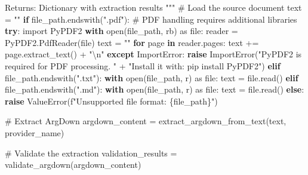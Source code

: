 \documentclass[
  11pt,
  letterpaper,
]{book}
\newenvironment{Shaded}{\begin{snugshade}}{\end{snugshade}}
\newcommand{\BuiltInTok}[1]{\textcolor[rgb]{0.00,0.23,0.31}{#1}}
\newcommand{\CharTok}[1]{\textcolor[rgb]{0.13,0.47,0.30}{#1}}
\newcommand{\CommentTok}[1]{\textcolor[rgb]{0.37,0.37,0.37}{#1}}
\newcommand{\ControlFlowTok}[1]{\textcolor[rgb]{0.00,0.23,0.31}{\textbf{#1}}}
\newcommand{\ImportTok}[1]{\textcolor[rgb]{0.00,0.46,0.62}{#1}}
\newcommand{\KeywordTok}[1]{\textcolor[rgb]{0.00,0.23,0.31}{\textbf{#1}}}
\newcommand{\NormalTok}[1]{\textcolor[rgb]{0.00,0.23,0.31}{#1}}
\newcommand{\OperatorTok}[1]{\textcolor[rgb]{0.37,0.37,0.37}{#1}}
\newcommand{\PreprocessorTok}[1]{\textcolor[rgb]{0.68,0.00,0.00}{#1}}
\newcommand{\SpecialCharTok}[1]{\textcolor[rgb]{0.37,0.37,0.37}{#1}}
\newcommand{\SpecialStringTok}[1]{\textcolor[rgb]{0.13,0.47,0.30}{#1}}
\newcommand{\StringTok}[1]{\textcolor[rgb]{0.13,0.47,0.30}{#1}}
\begin{document}
\begin{Shaded}
\begin{Highlighting}[]
\CommentTok{    Returns:}
\CommentTok{        Dictionary with extraction results}
\CommentTok{    """}
    \CommentTok{\# Load the source document}
\NormalTok{    text }\OperatorTok{=} \StringTok{""}
    \ControlFlowTok{if}\NormalTok{ file\_path.endswith(}\StringTok{".pdf"}\NormalTok{):}
        \CommentTok{\# PDF handling requires additional libraries}
        \ControlFlowTok{try}\NormalTok{:}
            \ImportTok{import}\NormalTok{ PyPDF2}
            \ControlFlowTok{with} \BuiltInTok{open}\NormalTok{(file\_path, }\StringTok{\textquotesingle{}rb\textquotesingle{}}\NormalTok{) }\ImportTok{as} \BuiltInTok{file}\NormalTok{:}
\NormalTok{                reader }\OperatorTok{=}\NormalTok{ PyPDF2.PdfReader(}\BuiltInTok{file}\NormalTok{)}
\NormalTok{                text }\OperatorTok{=} \StringTok{""}
                \ControlFlowTok{for}\NormalTok{ page }\KeywordTok{in}\NormalTok{ reader.pages:}
\NormalTok{                    text }\OperatorTok{+=}\NormalTok{ page.extract\_text() }\OperatorTok{+} \StringTok{"}\CharTok{\textbackslash{}n}\StringTok{"}
        \ControlFlowTok{except} \PreprocessorTok{ImportError}\NormalTok{:}
            \ControlFlowTok{raise} \PreprocessorTok{ImportError}\NormalTok{(}\StringTok{"PyPDF2 is required for PDF processing. "}
              \OperatorTok{+} \StringTok{"Install it with: pip install PyPDF2"}\NormalTok{)}
    \ControlFlowTok{elif}\NormalTok{ file\_path.endswith(}\StringTok{".txt"}\NormalTok{):}
        \ControlFlowTok{with} \BuiltInTok{open}\NormalTok{(file\_path, }\StringTok{\textquotesingle{}r\textquotesingle{}}\NormalTok{) }\ImportTok{as} \BuiltInTok{file}\NormalTok{:}
\NormalTok{            text }\OperatorTok{=} \BuiltInTok{file}\NormalTok{.read()}
    \ControlFlowTok{elif}\NormalTok{ file\_path.endswith(}\StringTok{".md"}\NormalTok{):}
        \ControlFlowTok{with} \BuiltInTok{open}\NormalTok{(file\_path, }\StringTok{\textquotesingle{}r\textquotesingle{}}\NormalTok{) }\ImportTok{as} \BuiltInTok{file}\NormalTok{:}
\NormalTok{            text }\OperatorTok{=} \BuiltInTok{file}\NormalTok{.read()}
    \ControlFlowTok{else}\NormalTok{:}
        \ControlFlowTok{raise} \PreprocessorTok{ValueError}\NormalTok{(}\SpecialStringTok{f"Unsupported file format: }\SpecialCharTok{\{}\NormalTok{file\_path}\SpecialCharTok{\}}\SpecialStringTok{"}\NormalTok{)}

    \CommentTok{\# Extract ArgDown}
\NormalTok{    argdown\_content }\OperatorTok{=}\NormalTok{ extract\_argdown\_from\_text(text, provider\_name)}

    \CommentTok{\# Validate the extraction}
\NormalTok{    validation\_results }\OperatorTok{=}\NormalTok{ validate\_argdown(argdown\_content)}


\end{Highlighting}
\end{Shaded}
\end{document}
